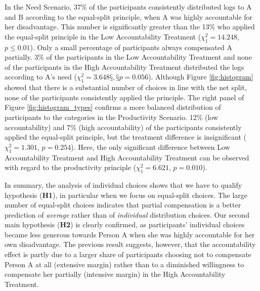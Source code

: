 \documentclass[smallcondensed]{svjour3}
\begin{document}
%
In the Need Scenario, 37\% of the participants consistently distributed logs to A and B according to the equal-split principle, when A was highly accountable for her disadvantage. This number is significantly greater than the 13\% who applied the equal-split principle in the Low Accountability Treatment ($\chi^2_1=14.248$, $p\le0.01$). Only a small percentage of participants always compensated A partially. 3\% of the participants in the Low Accountability Treatment and none of the participants in the High Accountability Treatment distributed the logs according to A's need ($\chi^2_1=3.648§, §p=0.056$). Although Figure \ref{fig:histogram} showed that there is a substantial number of choices in line with the net split, none of the participants consistently applied the principle. The right panel of Figure \ref{fig:histogram_types} confirms a more balanced distribution of participants to the categories in the Productivity Scenario. 12\% (low accountability) and 7\% (high accountability) of the participants consistently applied the equal-split principle, but the treatment difference is insignificant ($\chi^2_1=1.301$, $p=0.254$). Here, the only significant difference between Low Accountability Treatment and High Accountability Treatment can be observed with regard to the productivity principle ($\chi^2_1=6.621$, $p=0.010$).\par
%
In summary, the analysis of individual choices shows that we have to qualify hypothesis (\textbf{H1}), in particular when we focus on equal-split choices. The large number of equal-split choices indicates that partial compensation is a better prediction of \textit{average} rather than of \textit{individual} distribution choices. Our second main hypothesis (\textbf{H2}) is clearly confirmed, as participants' individual choices became less generous towards Person A when she was highly accountable for her own disadvantage. The previous result suggests, however, that the accountability effect is partly due to a larger share of participants choosing not to compensate Person A at all (extensive margin) rather than to a diminished willingness to compensate her partially (intensive margin) in the High Accountability Treatment.\par
%
\end{document}
